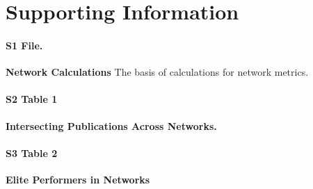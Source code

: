 \documentclass[10pt,letterpaper]{article}
\begin{document}
\section*{Supporting Information}

\paragraph*{S1 File.}
\label{S1_File}
{\bf Network Calculations} The basis of calculations for network metrics.

\paragraph*{S2 Table 1}
\label{S2_Table 1}
{\bf Intersecting Publications Across Networks.} 

\paragraph*{S3 Table 2}
\label{S3_Table 2}
{\bf Elite Performers in Networks} 
\end{document}
